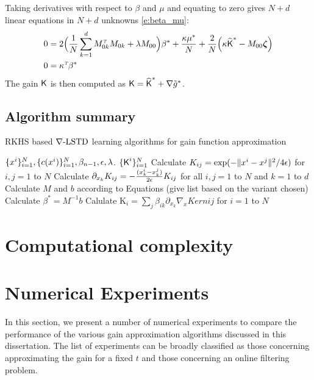 Taking derivatives with respect to $\beta $ and $\mu $ and equating to zero gives $N+d$ linear equations in $N+d$ unknowns \eqref{e:beta_mu}:
\begin{equation}
\begin{aligned}
0  &=  2 \Bigl(  \frac{1}{N}  \sum_{k=1}^d M_{0k}^\transpose M_{0k}   +  \lambda M_{00} \Bigr) \beta ^* + \frac{ \kappa \mu ^*}{N}+  \frac{2}{N} \Bigl( \kappa \hakFPF^*  -   M_{00} \boldsymbol{\zeta} \Bigr)  \\
0  & = \kappa^{\transpose} \beta^*
\label{e:beta_mu}
\end{aligned}
\end{equation}
The gain $\text{\sf K}$ is then computed as
$
\text{\sf K} = \widehat{\text{\sf K}}^* + \nabla \tilde g^*$.

\subsection{Algorithm summary}
\label{alg:rkhs}
\begin{algorithm}{RKHS based $\nabla\text{-LSTD}$ learning algorithms for gain function approximation}
	\begin{algorithmic}[1]
		\Require $\{x^i\}_{i=1}^N, \{c(x^i)\}_{i=1}^N, \beta_{n-1}, \epsilon, \lambda$.
		\Ensure $\{\text{\sf K}^i\}_{i=1}^N$
		\State Calculate $K_{ij} = \exp(-\|x^i - x^j\|^2/ 4\epsilon)$ for $i,j = 1$ to $N$  
		\State Calculate $ \partial_{x_k}K_{ij} = -\frac{(x_k^i - x_k^j)}{2\epsilon} K_{ij}$ for all $i,j =1$ to $N$ and $k = 1$ to $d$ 
		\State Calculate $M$ and $b$ according to Equations (give list based on the variant chosen)
		\State Calculate $\beta^* = M^{-1}b$
		\State Calulate $\text{K}_i  = \sum_j \beta_{ik} \partial_{x_k} \nabla_{x}Kern{ij}$ for $i =1$ to $N$ 
	\end{algorithmic}
\end{algorithm} 

\section{Computational complexity}
\label{s:computational_complexity}

\section{Numerical Experiments}
\label{s:fpf_numerics}
In this section, we present a number of numerical experiments to compare the performance of the various gain approximation algorithms discussed in this dissertation. The list of experiments can be broadly classified as those concerning approximating the gain for a fixed $t$ and those concerning an online filtering problem.  
 

